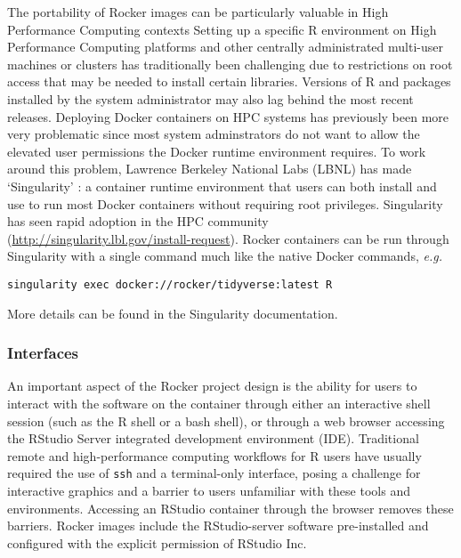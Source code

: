 The portability of Rocker images can be particularly valuable in High
Performance Computing contexts Setting up a specific R environment on
High Performance Computing platforms and other centrally administrated
multi-user machines or clusters has traditionally been challenging due
to restrictions on root access that may be needed to install certain
libraries. Versions of R and packages installed by the system
administrator may also lag behind the most recent releases. Deploying
Docker containers on HPC systems has previously been more very
problematic since most system adminstrators do not want to allow the
elevated user permissions the Docker runtime environment requires. To
work around this problem, Lawrence Berkeley National Labs (LBNL) has
made `Singularity' \citep{singularity}: a container runtime environment
that users can both install and use to run most Docker containers
without requiring root privileges. Singularity has seen rapid adoption
in the HPC community (\url{http://singularity.lbl.gov/install-request}).
Rocker containers can be run through Singularity with a single command
much like the native Docker commands, \emph{e.g.}

\begin{verbatim}
singularity exec docker://rocker/tidyverse:latest R
\end{verbatim}

\noindent More details can be found in the Singularity documentation.

\subsubsection{Interfaces}\label{interfaces}

An important aspect of the Rocker project design is the ability for
users to interact with the software on the container through either an
interactive shell session (such as the R shell or a bash shell), or
through a web browser accessing the
RStudio\textsuperscript{\textregistered} Server integrated development
environment (IDE). Traditional remote and high-performance computing
workflows for R users have usually required the use of \texttt{ssh} and
a terminal-only interface, posing a challenge for interactive graphics
and a barrier to users unfamiliar with these tools and environments.
Accessing an RStudio\textsuperscript{\textregistered} container through
the browser removes these barriers. Rocker images include the
RStudio-server software pre-installed and configured with the explicit
permission of RStudio\textsuperscript{\textregistered} Inc.

